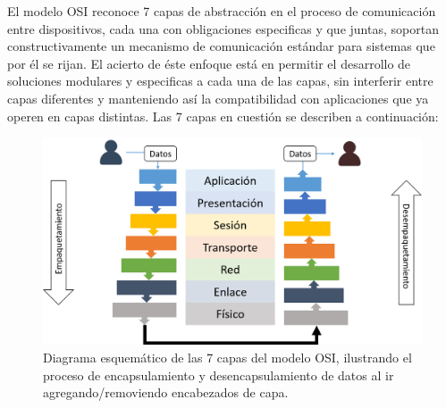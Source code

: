 El modelo OSI reconoce 7 capas de abstracción en el proceso de comunicación entre dispositivos, cada una con obligaciones especificas y que juntas, soportan constructivamente un mecanismo de comunicación estándar para sistemas que por él se rijan. El acierto de éste enfoque está en permitir el desarrollo de soluciones modulares y especificas a cada una de las capas, sin interferir entre capas diferentes y manteniendo así la compatibilidad con aplicaciones que ya operen en capas distintas. Las 7 capas en cuestión se describen a continuación:

\begin{figure}[!h]
	\centering
	\includegraphics[scale=.45]{imagenes/OSI7Capas.png}
	\caption{Diagrama esquemático de las 7 capas del modelo OSI, ilustrando el proceso de encapsulamiento y desencapsulamiento de datos al ir agregando/removiendo encabezados de capa.}
	\label{netfilterArchitecture}
\end{figure}

